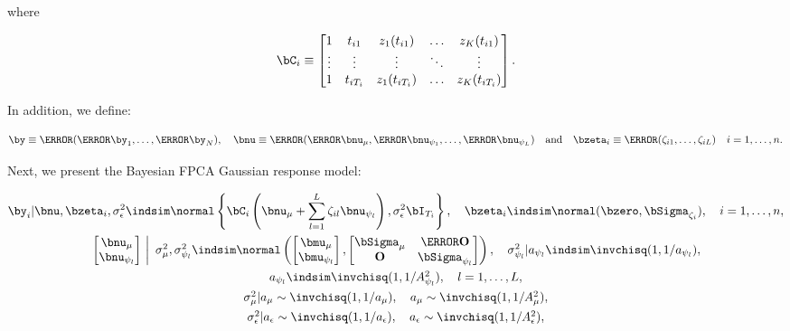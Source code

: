 \documentclass[12pt]{article}
\def\sigsqeps{\sigma^2_{\epsilon}}
\def\aeps{a_{\epsilon}}
\def\Asqeps{A_{\epsilon}^2}
\def\sigsqmu{\sigma^2_{\mu}}
\def\amu{a_{\mu}}
\def\Asqmu{A_{\mu}^2}
\def\numu{\bnu_\mu}
\newcommand\nupsi[1]{\bnu_{\psi_{#1}}}
\newcommand\sigsqpsi[1]{\sigma^2_{\psi_{#1}}}
\newcommand\apsi[1]{a_{\psi_{#1}}}
\newcommand\Asqpsi[1]{A_{\psi_{#1}}^2}
\theoremstyle{plain}
\theoremstyle{definition}
\theoremstyle{remark}
\begin{document}
\noindent where

\begin{equation}
	\bC_i \equiv \begin{bmatrix}
		1 & t_{i1} & z_1 (t_{i1}) & \dots & z_K (t_{i1}) \\
		\vdots & \vdots & \vdots & \ddots & \vdots \\
		1 & t_{iT_i} & z_1 (t_{iT_i}) & \dots & z_K (t_{iT_i})
	\end{bmatrix}.
\label{C_mat}
\end{equation}

\noindent In addition, we define:

\begin{equation}
	\by \equiv \T{(\T{\by_1}, \dots, \T{\by_N})}, \quad
	\bnu \equiv \T{(\T{\numu}, \T{\nupsi{1}}, \dots, \T{\nupsi{L}})} \quad
	\text{and} \quad
	\bzeta_i \equiv \T{(\zeta_{i1}, \dots, \zeta_{iL})} \quad i = 1, \dots, n.
\label{partitioned_vectors}
\end{equation}

Next, we present the Bayesian FPCA Gaussian response model:

\begin{equation}
\begin{gathered}
	\by_i | \bnu, \bzeta_i, \sigsqeps \indsim \normal \left\{
		\bC_i \left( \numu + \sum_{l=1}^L \zeta_{il} \nupsi{l} \right), \sigsqeps \bI_{T_i}
	\right\}, \quad
	\bzeta_i \indsim \normal (\bzero, \bSigma_{\zeta_i}), \quad
	i = 1, \dots, n, \\
	$$
	\left.\begin{bmatrix}
		\numu \\
		\nupsi{l}
	\end{bmatrix} \ \right| \ \sigsqmu, \sigsqpsi{l}
		\indsim
			\normal \left(
				\begin{bmatrix}
					\bmu_\mu \\
					\bmu_{\psi_l} \\
				\end{bmatrix},
				\begin{bmatrix}
					\bSigma_\mu & \T{\textbf{O}} \\
					\textbf{O} & \bSigma_{\psi_l}
				\end{bmatrix}
			\right), \quad
	\sigsqpsi{l} | \apsi{l} \indsim \invchisq (1, 1/\apsi{l}), \\
	$$
	\apsi{l} \indsim \invchisq (1, 1/\Asqpsi{l}), \quad l = 1, \dots, L, \\
	$$
	\sigsqmu | \amu \sim \invchisq (1, 1/\amu), \quad \amu \sim \invchisq(1, 1/\Asqmu), \\
	$$
	\sigsqeps | \aeps \sim \invchisq (1, 1/\aeps), \quad \aeps \sim \invchisq(1, 1/\Asqeps),
\end{gathered}
\label{bayes_fpca_mod}
\end{equation}
\end{document}
